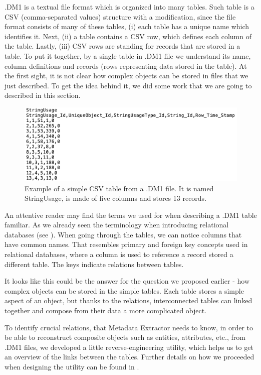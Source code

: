 .DM1 is a textual file format which is organized into many tables.
Such table is a CSV (comma-separated values) structure with a modification, since the file format consists of many of these tables, (i) each table has a unique name which identifies it. 
Next, (ii) a table contains a CSV row, which defines each column of the table. 
Lastly, (iii) CSV rows are standing for records that are stored in a table. 
To put it together, by a single table in .DM1 file we understand its name, column definitions and records (rows representing data stored in the table).
At the first sight, it is not clear how complex objects can be stored in files that we just described. To get the idea behind it, we did some work that we are going to described in this section. 

\begin{figure}[H]
	\centering
	\includegraphics[width=14cm]{../img/StringUsageTable}
	\caption[Table from .DM1 file]{Example of a simple CSV table from a .DM1 file. It is named StringUsage, is made of five columns and stores 13 records.}
\end{figure}


An attentive reader may find the terms we used for when describing a .DM1 table familiar. 
As we already seen the terminology when introducing relational databases (see ). 
When going through the tables, we can notice columns that have common names.
That resembles primary and foreign key concepts used in relational databases, where a column is used to reference a record stored a different table. 
The keys indicate relations between tables.

It looks like this could be the answer for the question we proposed earlier - how complex objects can be stored in the simple tables. Each table stores a simple aspect of an object, but thanks to the relations, interconnected tables can linked together and compose from their data a more complicated object.

To identify crucial relations, that Metadata Extractor needs to know, in order to be able to reconstruct composite objects such as entities, attributes, etc., from .DM1 files, we developed a little reverse-engineering utility, which helps us to get an overview of the links between the tables.
Further details on how we proceeded when designing the utility can be found in . 

